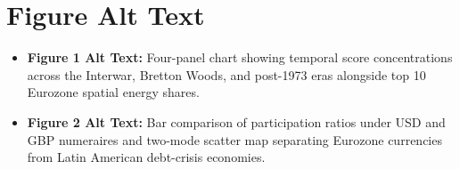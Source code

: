 \documentclass[11pt,a4paper]{article}
\begin{document}
\section*{Figure Alt Text}
\begin{itemize}
    \item \textbf{Figure 1 Alt Text:} Four-panel chart showing temporal score concentrations across the Interwar, Bretton Woods, and post-1973 eras alongside top 10 Eurozone spatial energy shares.
    \item \textbf{Figure 2 Alt Text:} Bar comparison of participation ratios under USD and GBP numeraires and two-mode scatter map separating Eurozone currencies from Latin American debt-crisis economies.
\end{itemize}
\end{document}
